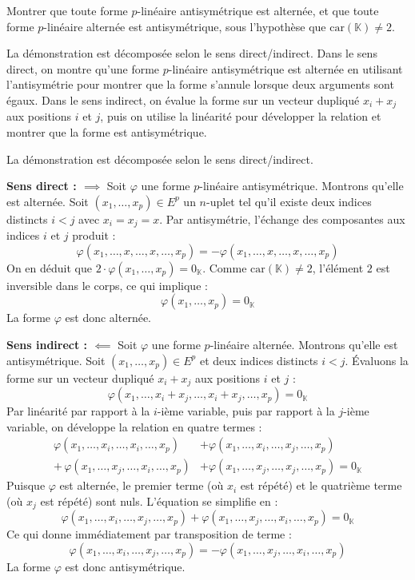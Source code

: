 \documentclass[11pt, a4paper]{article}
\theoremstyle{definition}
\begin{document}
\clearpage

\begin{tcolorbox}[instructionstyle]
	Montrer que toute forme $p$-linéaire antisymétrique est alternée, et que toute forme $p$-linéaire alternée est antisymétrique, sous l'hypothèse que $\text{car}(\mathbb{K}) \neq 2$.
\end{tcolorbox}

\begin{tcolorbox}[methodstyle]
	La démonstration est décomposée selon le sens direct/indirect. Dans le sens direct, on montre qu'une forme $p$-linéaire antisymétrique est alternée en utilisant l'antisymétrie pour montrer que la forme s'annule lorsque deux arguments sont égaux. Dans le sens indirect, on évalue la forme sur un vecteur dupliqué $x_i + x_j$ aux positions $i$ et $j$, puis on utilise la linéarité pour développer la relation et montrer que la forme est antisymétrique.
\end{tcolorbox}

La démonstration est décomposée selon le sens direct/indirect.
\begin{outline}
	\1 \textbf{Sens direct : $\implies$}
	\2 Soit $\varphi$ une forme $p$-linéaire antisymétrique. Montrons qu'elle est alternée.
	\2 Soit $(x_1,\dots,x_p) \in E^p$ un $n$-uplet tel qu'il existe deux indices distincts $i < j$ avec $x_i = x_j = x$.
	\2 Par antisymétrie, l'échange des composantes aux indices $i$ et $j$ produit :
	$$\varphi(x_1, \dots, x, \dots, x, \dots, x_p) = -\varphi(x_1, \dots, x, \dots, x, \dots, x_p)$$
	\2 On en déduit que $2 \cdot \varphi(x_1, \dots, x_p) = 0_\mathbb{K}$. Comme $\text{car}(\mathbb{K}) \neq 2$, l'élément $2$ est inversible dans le corps, ce qui implique :
	$$\varphi(x_1, \dots, x_p) = 0_\mathbb{K}$$
	\2 La forme $\varphi$ est donc alternée.

	\1 \textbf{Sens indirect : $\impliedby$}
	\2 Soit $\varphi$ une forme $p$-linéaire alternée. Montrons qu'elle est antisymétrique.
	\2 Soit $(x_1,\dots,x_p) \in E^p$ et deux indices distincts $i < j$. Évaluons la forme sur un vecteur dupliqué $x_i + x_j$ aux positions $i$ et $j$ :
	$$\varphi(x_1, \dots, x_i + x_j, \dots, x_i + x_j, \dots, x_p) = 0_\mathbb{K}$$
	\2 Par linéarité par rapport à la $i$-ième variable, puis par rapport à la $j$-ième variable, on développe la relation en quatre termes :
	\begin{align*}
		\varphi(x_1, \dots, x_i, \dots, x_i, \dots, x_p) &+ \varphi(x_1, \dots, x_i, \dots, x_j, \dots, x_p) \\
		+\, \varphi(x_1, \dots, x_j, \dots, x_i, \dots, x_p) &+ \varphi(x_1, \dots, x_j, \dots, x_j, \dots, x_p) = 0_\mathbb{K}
	\end{align*}
	\2 Puisque $\varphi$ est alternée, le premier terme (où $x_i$ est répété) et le quatrième terme (où $x_j$ est répété) sont nuls. L'équation se simplifie en :
	$$\varphi(x_1, \dots, x_i, \dots, x_j, \dots, x_p) + \varphi(x_1, \dots, x_j, \dots, x_i, \dots, x_p) = 0_\mathbb{K}$$
	\2 Ce qui donne immédiatement par transposition de terme :
	$$\varphi(x_1, \dots, x_i, \dots, x_j, \dots, x_p) = -\varphi(x_1, \dots, x_j, \dots, x_i, \dots, x_p)$$
	\2 La forme $\varphi$ est donc antisymétrique.
\end{outline}
\end{document}

